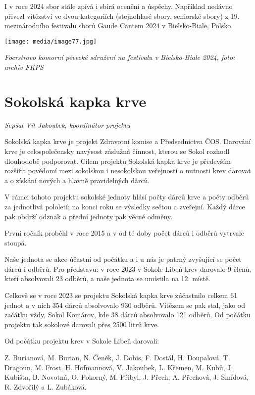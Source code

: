 I v roce 2024 sbor stále zpívá i sbírá ocenění a úspěchy. Například
nedávno přivezl vítězství ve dvou kategoriích (stejnohlasé sbory,
seniorské sbory) z 19. mezinárodního festivalu sborů Gaude Cantem 2024 v
Bielsko-Biale, Polsko.

\texttt{[image: media/image77.jpg]}

\emph{Foerstrovo komorní pěvecké sdružení na festivalu v Bielsko-Biale
2024, foto: archiv FKPS}

\section{Sokolská kapka krve}\label{sokolskuxe1-kapka-krve}

\emph{Sepsal Vít Jakoubek, koordinátor projektu}

Sokolská kapka krve je projekt Zdravotní komise a Předsednictva ČOS.
Darování krve je celospolečensky navýsost záslužná činnost, kterou se
Sokol rozhodl dlouhodobě podporovat. Cílem projektu Sokolská kapka krve
je především rozšířit povědomí mezi sokolskou i nesokolskou veřejností o
nutnosti krev darovat a o získání nových a hlavně pravidelných dárců.

V rámci tohoto projektu sokolské jednoty hlásí počty dárců krve a počty
odběrů za jednotlivá pololetí; na konci roku se výsledky sečtou a
zveřejní. Každý dárce pak obdrží odznak a přední jednoty pak věcné
odměny.

První ročník proběhl v roce 2015 a v od té doby počet dárců i odběrů
vytrvale stoupá.

Naše jednota se akce účastní od počátku a i u nás je patrný zvyšující se
počet dárců i odběrů. Pro představu: v roce 2023 v Sokole Libeň krev
darovalo 9 členů, kteří absolvovali 23 odběrů, a naše jednota se
umístila na 12. místě.

Celkově se v roce 2023 se projektu Sokolská kapka krve zúčastnilo celkem
61 jednot a v nich 354 dárců absolvovalo 930 odběrů. Vítězem se pak
stal, jako od začátku vždy, Sokol Komárov, kde 38 dárců absolvovalo 121
odběrů. Od počátku projektu tak sokolové darovali přes 2500 litrů krve.

Od počátku projektu krev v Sokole Libeň darovali:

Z. Burianová, M. Burian, N. Čeněk, J. Dobis, F. Dostál, H. Doupalová, T.
Dragoun, M. Frost, H. Hofmannová, V. Jakoubek, L. Křemen, M. Kubů, J.
Kubišta, B. Novotná, O. Pokorný, M. Přibyl, J. Přech, A. Přechová, J.
Šmídová, R. Zdvořilý a L. Zubáková.

